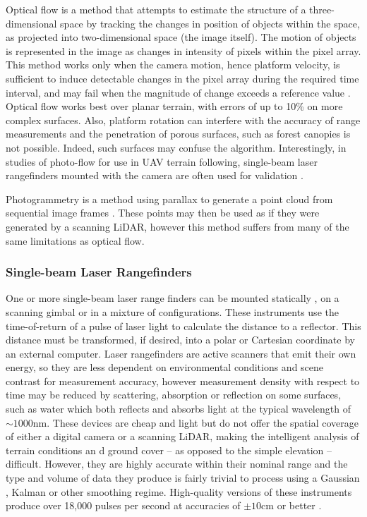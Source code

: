 \documentclass[10pt]{article}
\begin{document}
Optical flow is a method that attempts to estimate the structure of a three-dimensional space by tracking the changes in position of objects within the space, as projected into two-dimensional space (the image itself). The motion of objects is represented in the image as changes in intensity of pixels within the pixel array. This method works only when the camera motion, hence platform velocity, is sufficient to induce detectable changes in the pixel array during the required time interval, and may fail when the magnitude of change exceeds a reference value \cite{Srinivasan1994}. Optical flow works best over planar terrain, with errors of up to 10\% \cite{Campos2016} on more complex surfaces. Also, platform rotation can interfere with the accuracy of range measurements and the penetration of porous surfaces, such as forest canopies is not possible. Indeed, such surfaces may confuse the algorithm. Interestingly, in studies of photo-flow for use in UAV terrain following, single-beam laser rangefinders mounted with the camera are often used for validation \cite{Campos2016}.

Photogrammetry is a method using parallax to generate a point cloud from sequential image frames \cite{Carrivick2016}. These points may then be used as if they were generated by a scanning LiDAR, however this method suffers from many of the same limitations as optical flow.

\subsubsection{Single-beam Laser Rangefinders}

One or more single-beam laser range finders can be mounted statically \cite{Alqahtani2018}, on a scanning gimbal \cite{LightWare2017} or in a mixture of configurations. These instruments use the time-of-return of a pulse of laser light to calculate the distance to a reflector. This distance must be transformed, if desired, into a polar or Cartesian coordinate by an external computer. Laser rangefinders are active scanners that emit their own energy, so they are less dependent on environmental conditions and scene contrast for measurement accuracy, however measurement density with respect to time may be reduced by scattering, absorption or reflection on some surfaces, such as water which both reflects and absorbs light at the typical wavelength of $\sim1000\si{\nm}$. These devices are cheap and light but do not offer the spatial coverage of either a digital camera or a scanning LiDAR, making the intelligent analysis of terrain conditions an   d ground cover -- as opposed to the simple elevation -- difficult. However, they are highly accurate within their nominal range \cite{Campos2016} and the type and volume of data they produce is fairly trivial to process using a Gaussian \cite{Alqahtani2018}, Kalman \cite{Kalman1960} or other smoothing regime. High-quality versions of these instruments produce over 18,000 pulses per second at accuracies of $\pm10\si{\cm}$ or better \cite{LightWare2016}.
\end{document}
